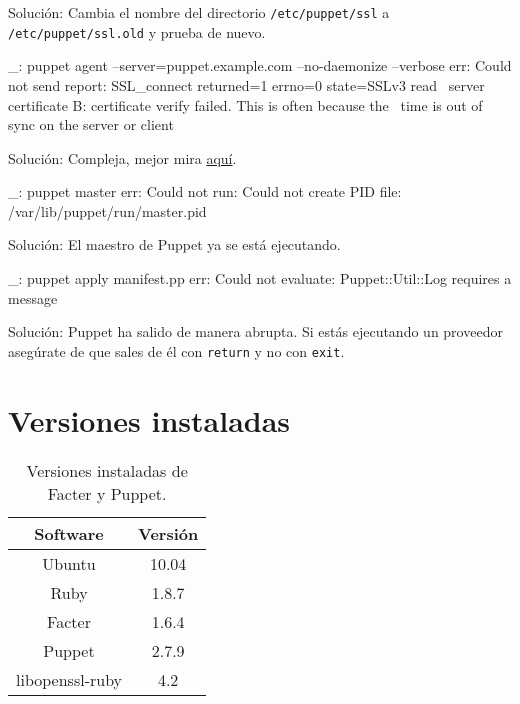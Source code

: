 Solución: Cambia el nombre del directorio \texttt{/etc/puppet/ssl} a \texttt{/etc/puppet/ssl.old} y prueba de nuevo.

\begin{bashcode}
_: puppet agent --server=puppet.example.com --no-daemonize --verbose
err: Could not send report: SSL_connect returned=1 errno=0 state=SSLv3 read \
server certificate B: certificate verify failed. This is often because the \
time is out of sync on the server or client
\end{bashcode}

Solución: Compleja, mejor mira \href{http://projects.puppetlabs.com/projects/1/wiki/Certificates_And_Security}{aquí}.

\begin{bashcode}
_: puppet master
err: Could not run: Could not create PID file: /var/lib/puppet/run/master.pid
\end{bashcode}

Solución: El maestro de Puppet ya se está ejecutando.

\begin{bashcode}
_: puppet apply manifest.pp
err: Could not evaluate: Puppet::Util::Log requires a message
\end{bashcode}

Solución: Puppet ha salido de manera abrupta. Si estás ejecutando un proveedor asegúrate de que sales de él con \texttt{return} y no con \texttt{exit}.


\section{Versiones instaladas}

\begin{table}[!htbp]
\centering
   \begin{tabular}{|c|c|}
      \hline
      \textbf{Software} & \textbf{Versión} \\ \hline
      Ubuntu & 10.04 \\ \hline
      Ruby   & 1.8.7 \\ \hline
      Facter & 1.6.4 \\ \hline
      Puppet & 2.7.9 \\ \hline
      libopenssl-ruby &	4.2 \\ \hline
   \end{tabular}
\caption{Versiones instaladas de Facter y Puppet.}
\label{table:puppet-versions}
\end{table}
